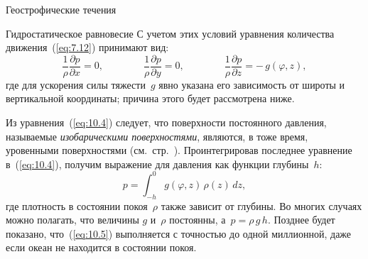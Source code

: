\begin{chapter}{Геострофические течения}
\begin{section}{Гидростатическое равновесие}
С учетом этих условий уравнения количества движения~(\ref{eq:7.12})
принимают вид:
\begin{equation}\label{eq:10.4}
\frac{1}{\rho}\frac{\partial p}{\partial x}=0, \qquad \qquad
\frac{1}{\rho}\frac{\partial p}{\partial y}=0, \qquad \qquad
\frac{1}{\rho}\frac{\partial p}{\partial z}=-\,g(\varphi,z),
\end{equation}
где для ускорения силы тяжести~$g$ явно указана его зависимость от широты 
и вертикальной координаты; причина этого будет рассмотрена ниже.
%

Из уравнения~(\ref{eq:10.4}) следует, что поверхности постоянного давления,
называемые \emph{изобарическими поверхностями},%
 являются, в тоже время,
уровенными поверхностями 
(см.\ стр.~\pageref{LevelSurface}). 
Проинтегрировав последнее уравнение в~(\ref{eq:10.4}), получим
выражение для давления как функции глубины~$h$:
\begin{equation}\label{eq:10.5}
 p=\int_{-h}^0 g(\varphi,z)\,\rho(z)\,dz,
\end{equation}
где плотность в состоянии покоя~$\rho$ также зависит от глубины.
Во многих случаях можно полагать, что величины $g$ и~$\rho$ постоянны, 
а~$p = \rho \,g\,h$. Позднее будет показано, что~(\ref{eq:10.5}) выполняется 
с точностью до одной миллионной, даже если океан не находится в 
состоянии покоя.
%


\end{section}
\end{chapter}
